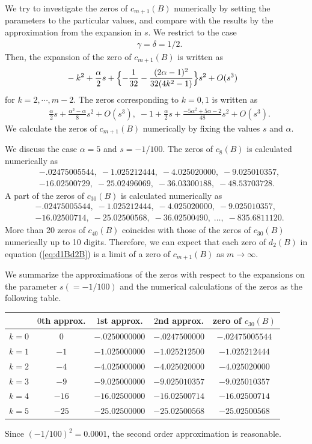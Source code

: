\documentclass[12pt]{amsart}
\numberwithin{equation}{section}
\theoremstyle{definition}
\theoremstyle{remark}
\begin{document}
We try to investigate the zeros of $ c_{m+1} (B)$ numerically by setting the parameters to the particular values, and compare with the results by the approximation from the expansion in $s$.
We restrict to the case
\begin{align}
& \gamma =\delta = 1/2 .
\end{align}
Then, the expansion of the zero of $c_{m+1} (B) $  is written as
\begin{align}
& -k^2+ \frac{\alpha }{2} s + \Bigl\{ -\frac{1}{32} - \frac{(2\alpha -1)^2}{32(4 k^2 -1) }  \Bigr\} s^2 + O(s^3) 
\end{align}
for $k= 2,\cdots, m-2  $.
The zeros corresponding to $k=0,1$ is written as
\begin{align}
& \frac{\alpha }{2} s + \frac{\alpha ^2 - \alpha }{8 }  s^2  + O(s^3) , \;  -1 +\frac{\alpha }{2} s +  \frac{- 5 \alpha ^2 +5 \alpha  -2}{48} s^2 + O(s^3) .
\end{align}
We calculate the zeros of $c_{m+1} (B)$ numerically by fixing the values $s$ and $\alpha $.

We discuss the case $\alpha =5$ and $s=-1/100$.
The zeros of $c_{8} (B)$ is calculated numerically as
\begin{align*}
& -.02475005544, \; -1.025212444, \; -4.025020000, \; -9.025010357, \\
& -16.02500729 , \; -25.02496069, \; -36.03300188, \; -48.53703728.
\end{align*}
A part of the zeros of $c_{30} (B)$ is calculated numerically as
\begin{align*}
& -.02475005544, \; -1.025212444, \; -4.025020000, \; -9.025010357, \\
& -16.02500714 , \; -25.02500568, \; -36.02500490, \; \dots , \; -835.6811120 .
\end{align*}
More than 20 zeros of $c_{40} (B)$ coincides with those of the zeros of $c_{30} (B)$ numerically up to 10 digits.
Therefore, we can expect that each zero of $d_2 (B)$ in equation (\ref{eq:d1Bd2B}) is a limit of a zero of $c_{m+1} (B)$ as $m \to \infty $.

We summarize the approximations of the zeros with respect to the expansions on the parameter $s(=-1/100)$ and the numerical calculations of the zeros as the following table.
\begin{center}
\begin{tabular}{c|c|c|c|c}
& $0$th approx. & $1$st approx. & $2$nd approx. & zero of $ c_{30} (B) $ \\ \hline
$k=0$ & $0$ & $-.0250000000$ & $-.0247500000 $ & $-.02475005544$ \\
$k=1$ & $-1$ & $-1.025000000$ & $-1.025212500 $ & $-1.025212444$ \\
$k=2$ & $-4$ & $-4.025000000$ & $-4.025020000 $ & $-4.025020000$ \\
$k=3$ & $-9$ & $-9.025000000$ & $-9.025010357 $ & $-9.025010357$ \\
$k=4$ & $-16$ & $-16.02500000$ & $-16.02500714 $ & $ -16.02500714$ \\
$k=5$ & $-25$ & $-25.02500000$ & $-25.02500568 $ & $-25.02500568$
\end{tabular}
\end{center}
Since $(-1/100)^2=0.0001$, the second order approximation is reasonable.
\end{document}
